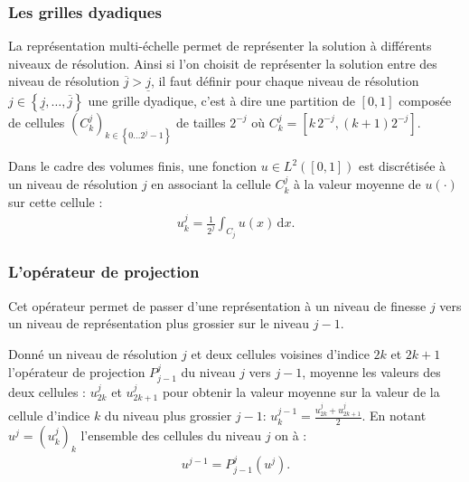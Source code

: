    \subsubsection{Les grilles dyadiques}
        La représentation multi-échelle permet de représenter la solution à différents niveaux de résolution. 
        Ainsi si l'on choisit de représenter la solution entre des niveau de résolution $\overline j > \underline j$, 
        il faut définir pour chaque niveau de résolution $j \in \left\{ \underline j, \dots, \overline j\right\}$ une grille dyadique, c'est à dire une partition de $[0,1]$
        composée de cellules $\left(C^j_k\right)_{k \in \left\{0\dots 2^{j}-1\right\}}$ de tailles $2^{-j}$ où $C^j_k = \left[k\,2^{-j} ,(k+1)2^{-j}\right]$.\par
        Dans le cadre des volumes finis, une fonction $u \in L^2\left(\left[0,1\right]\right)$ est discrétisée
        à un niveau de résolution $j$ en associant la cellule $C^j_k$ à la valeur moyenne de $u(\cdot)$ sur cette cellule :
        \begin{align}
            u^j_k = \frac{1}{2^{j}} \int_{C_j} u(x) \, \mathrm{d}x.
        \end{align}
        
    \subsubsection{L'opérateur de projection}
        Cet opérateur permet de passer d'une représentation à un niveau de finesse $j$ vers un niveau de représentation plus grossier sur le niveau $j-1$.
        \begin{definition}
            Donné un niveau de résolution $j$ et deux cellules voisines d'indice $2k$ et $2k+1$
            l'opérateur de projection $P_{j-1}^j$ du niveau $j$ vers $j-1$, moyenne les valeurs des deux cellules : $u^j_{2k}$ et $u^j_{2k+1}$
            pour obtenir la valeur moyenne sur la valeur de la cellule d'indice $k$ du niveau plus grossier $j-1$: $u_k^{j-1} = \frac{u_{2k}^j + u_{2k+1}^j}{2}$.
            En notant $u^j = \left(u^j_k\right)_{k}$ l'ensemble des cellules du niveau $j$ on à : 
            \begin{align}u^{j-1} = P^j_{j-1} \left(u^j\right).\end{align}
        \end{definition}
